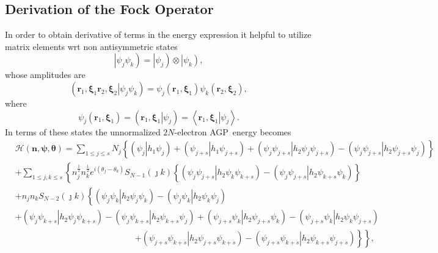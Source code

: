 \documentclass[aps,preprint]{revtex4}%
\begin{document}
\subsection{Derivation of the Fock Operator}

In order to obtain derivative of terms in the energy expression it helpful to
utilize matrix elements wrt non antisymmetric states
\begin{equation}
\left\vert \psi_{j}\psi_{k}\right)  =\left\vert \psi_{j}\right)
\otimes\left\vert \psi_{k}\right)  ,
\end{equation}
whose amplitudes are
\begin{equation}
\left(  \left.  \mathbf{r}_{1}\mathbf{,\xi}_{1}\mathbf{r}_{2}\mathbf{,\xi}%
_{2}\right\vert \psi_{j}\psi_{k}\right)  =\psi_{j}\left(  \mathbf{r}%
_{1}\mathbf{,\xi}_{1}\right)  \psi_{k}\left(  \mathbf{r}_{2}\mathbf{,\xi}%
_{2}\right)  ,
\end{equation}
where
\begin{equation}
\psi_{j}\left(  \mathbf{r}_{1}\mathbf{,\xi}_{1}\right)  =\left(  \left.
\mathbf{r}_{1}\mathbf{,\xi}_{1}\right\vert \psi_{j}\right)  =\left\langle
\left.  \mathbf{r}_{1}\mathbf{,\xi}_{1}\right\vert \psi_{j}\right\rangle .
\end{equation}
In terms of these states the unnormalized $2N$-electron AGP\ energy becomes
\begin{align}
&  \mathcal{H}\left(  \mathbf{n},\mathbf{\psi},\mathbf{\theta}\right)
=\sum_{1\leq j\leq s}N_{j}\left\{  \left(  \left.  \psi_{j}\right\vert
h_{1}\psi_{j}\right)  +\left(  \left.  \psi_{j+s}\right\vert h_{1}\psi
_{j+s}\right)  +\left(  \left.  \psi_{j}\psi_{j+s}\right\vert h_{2}\psi
_{j}\psi_{j+s}\right)  -\left(  \left.  \psi_{j}\psi_{j+s}\right\vert
h_{2}\psi_{j+s}\psi_{j}\right)  \right\} \nonumber\\
&  +\sum_{1\leq j,k\leq s}\left\{  n_{j}^{\frac{1}{2}}n_{k}^{\frac{1}{2}%
}e^{i\left(  \theta_{j}-\theta_{k}\right)  }S_{N-1}\left(  \jmath k\right)
\left\{  \left(  \left.  \psi_{j}\psi_{j+s}\right\vert h_{2}\psi_{k}\psi
_{k+s}\right)  -\left(  \left.  \psi_{j}\psi_{j+s}\right\vert h_{2}\psi
_{k+s}\psi_{k}\right)  \right\}  \right. \nonumber\\
&  +n_{j}n_{k}S_{N-2}\left(  \jmath k\right)  \left\{  \overset{}{}\left(
\left.  \psi_{j}\psi_{k}\right\vert h_{2}\psi_{j}\psi_{k}\right)  -\left(
\left.  \psi_{j}\psi_{k}\right\vert h_{2}\psi_{k}\psi_{j}\right)  \right. \\
&  +\left(  \left.  \psi_{j}\psi_{k+s}\right\vert h_{2}\psi_{j}\psi
_{k+s}\right)  -\left(  \left.  \psi_{j}\psi_{k+s}\right\vert h_{2}\psi
_{k+s}\psi_{j}\right)  +\left(  \left.  \psi_{j+s}\psi_{k}\right\vert
h_{2}\psi_{j+s}\psi_{k}\right)  -\left(  \left.  \psi_{j+s}\psi_{k}\right\vert
h_{2}\psi_{k}\psi_{j+s}\right) \nonumber\\
&  \qquad\qquad\qquad\qquad\qquad\qquad\qquad\left.  \left.  +\left(  \left.
\psi_{j+s}\psi_{k+s}\right\vert h_{2}\psi_{j+s}\psi_{k+s}\right)  -\left(
\left.  \psi_{j+s}\psi_{k+s}\right\vert h_{2}\psi_{k+s}\psi_{j+s}\right)
\right\}  \overset{}{}\right\}  , \label{unnormE}%
\end{align}
\end{document}

